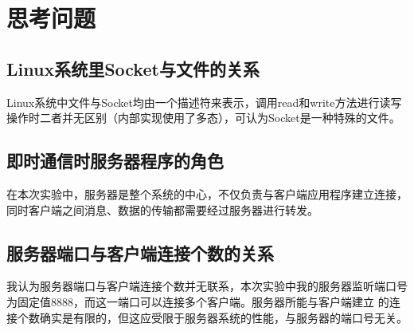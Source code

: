 \section{思考问题}
\subsection{Linux系统里Socket与文件的关系}
Linux系统中文件与Socket均由一个描述符来表示，调用read和write方法进行读写操作时二者并无区别（内部实现使用了多态），可认为Socket是一种特殊的文件。

\subsection{即时通信时服务器程序的角色}
在本次实验中，服务器是整个系统的中心，不仅负责与客户端应用程序建立连接，同时客户端之间消息、数据的传输都需要经过服务器进行转发。

\subsection{服务器端口与客户端连接个数的关系}
我认为服务器端口与客户端连接个数并无联系，本次实验中我的服务器监听端口号为固定值8888，而这一端口可以连接多个客户端。服务器所能与客户端建立
的连接个数确实是有限的，但这应受限于服务器系统的性能，与服务器的端口号无关。